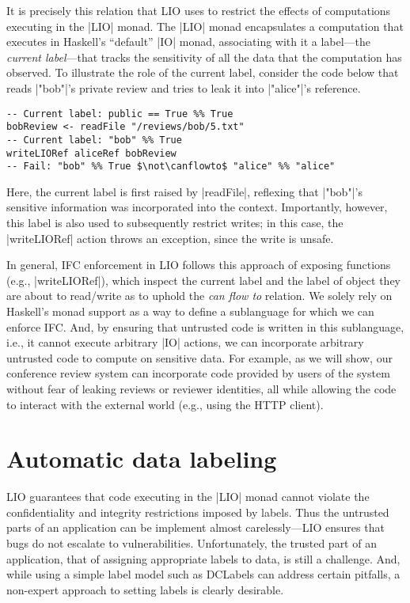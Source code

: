 It is precisely this relation that LIO uses to restrict the
effects of computations executing in the \hs|LIO| monad.
%
The \hs|LIO| monad encapsulates a computation that executes in Haskell's
``default'' \hs|IO| monad, associating
with it a label---the
\emph{current label}---that tracks the sensitivity of all the data
that the computation has observed.
%
To illustrate the role of the current label, consider the code below
that reads \hs|"bob"|'s private review and tries to leak it into
\hs|"alice"|'s reference.
\vspace*{-1.0em}
\begin{verbatim}
-- Current label: public == True %% True
bobReview <- readFile "/reviews/bob/5.txt"
-- Current label: "bob" %% True
writeLIORef aliceRef bobReview
-- Fail: "bob" %% True $\not\canflowto$ "alice" %% "alice"
\end{verbatim}
\vspace*{-0.4em}
%
Here, the current label is first raised by \hs|readFile|, reflexing
that \hs|"bob"|'s sensitive information was incorporated into the
context.
%
Importantly, however, this label is also used to subsequently restrict
writes; in this case, the \hs|writeLIORef| action throws an
exception, since the write is unsafe.

In general, IFC enforcement in LIO follows this approach of exposing
functions (e.g., \hs|writeLIORef|), which inspect the current label
and the label of object they are about to read/write as to uphold the
\emph{can flow to} relation.
%
We solely rely on Haskell's monad support as a way to define a
sublanguage for which we can enforce IFC.
%
And, by ensuring that untrusted code is written in this sublanguage, i.e.,
it cannot execute arbitrary \hs|IO| actions, we can incorporate
arbitrary untrusted code to compute on sensitive data.
%
For example, as we will show, our conference review system can
incorporate code provided by users of the system without fear of
leaking reviews or reviewer identities, all while allowing the code to
interact with the external world (e.g., using the HTTP client).


\section{Automatic data labeling}

LIO guarantees that code executing in the \hs|LIO| monad cannot
violate the confidentiality and integrity restrictions imposed by
labels.
%
Thus the untrusted parts of an application can be implement almost
carelessly---LIO ensures that bugs do not escalate to vulnerabilities.
%
Unfortunately, the trusted part of an application, that of assigning
appropriate labels to data, is still a challenge.
%
And, while using a simple label model such as DCLabels can address
certain pitfalls, a non-expert approach to setting labels is clearly
desirable.

